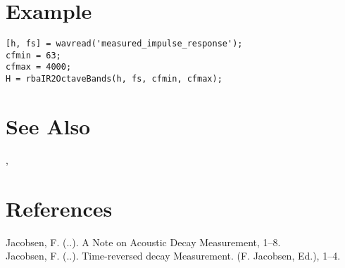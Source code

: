 


\section{Example} %
\label{sec:rbaIR2OctaveBands_example}
\begin{lstlisting}
[h, fs] = wavread('measured_impulse_response');
cfmin = 63;
cfmax = 4000;
H = rbaIR2OctaveBands(h, fs, cfmin, cfmax);
\end{lstlisting}



\section{See Also} %
\label{sec:rbaIR2OctaveBands_see_also}
\texttt{},\quad \texttt{}%


\section{References} %
\label{sec:rbaIR2OctaveBands_references}
Jacobsen, F. (..). A Note on Acoustic Decay Measurement, 1–8.\\
Jacobsen, F. (..). Time-reversed decay Measurement. (F. Jacobsen, Ed.), 1–4.\\


